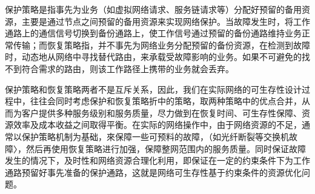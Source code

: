 
保护策略是指事先为业务（如虚拟网络请求、服务链请求等）分配好预留的备用资源，主要是通过节点之间预留的备用资源来实现网络保护。当故障发生时，将工作通路上的通信信号切换到备份通路上，使工作信号通过预留的备份通路维持业务正常传输；而恢复策略指，并不事先为网络业务分配预留的备份资源，在检测到故障时，动态地从网络中寻找替代路由，来承载受故障影响的业务。如果不可避免的找不到符合需求的路由，则该工作路径上携带的业务就会丢弃。



保护策略和恢复策略两者不是互斥关系，因此，我们在实际网络的可生存性设计过程中，往往会同时考虑保护和恢复策略折中的策略，取两种策略中的优点合并，从而为客户提供多种服务级别和服务质量，尽力做到在恢复时间、可生存性保障、资源效率及成本收益之间取得平衡。在实际的网络操作中，由于网络资源的不足，通常以保护策略机制为基础，來保障一些可预料的故障，（如光纤断裂等交换机故障〉，然后再使用恢复策略进行加强，保障整网范围内的服务质量。同时保证故障发生的情况下，及时性和网络资源合理化利用，即保证在一定的约束条件下为工作通路预留好事先准备的保护通路，这就是网络可生存性基于约束条件的资源优化问题。



